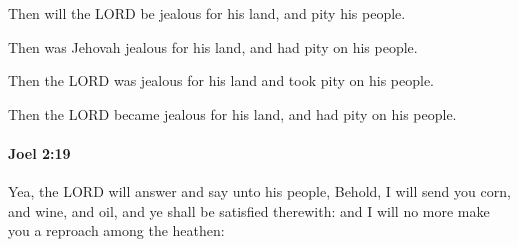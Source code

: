 			Then will the LORD be jealous for his land, and pity his people.

			\begin{versebox}
					\item[BHS] 
					\item[LXX] 
					\item[ASV] Then was Jehovah jealous for his land, and had pity on his people.
					\item[NIV] Then the LORD was jealous for his land and took pity on his people.
					\item[NRSV] Then the LORD became jealous for his land, and had pity on his people.
			\end{versebox}

		\paragraph{Joel 2:19} %
			\label{JOEL-2-19}

			Yea, the LORD will answer and say unto his people, Behold, I will send you corn, and wine, and oil, and ye shall be satisfied therewith: and I will no more make you a reproach among the heathen:

